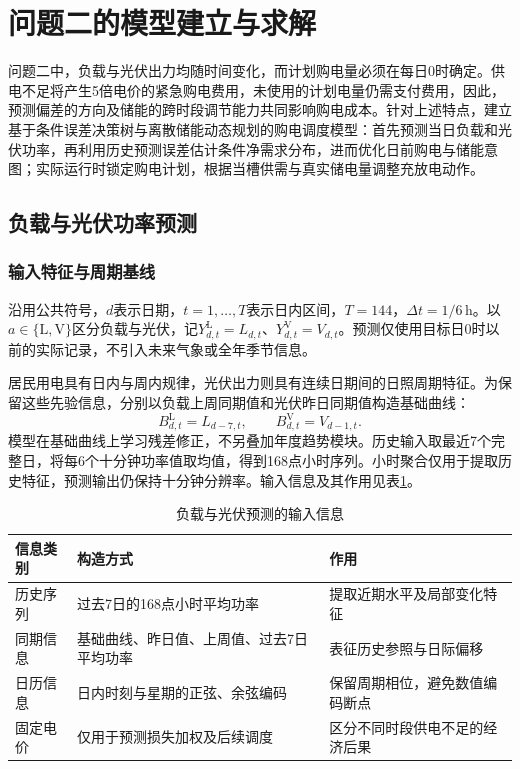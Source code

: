 \section{问题二的模型建立与求解}
\label{sec:q2-prediction}

问题二中，负载与光伏出力均随时间变化，而计划购电量必须在每日0时确定。供电不足将产生5倍电价的紧急购电费用，未使用的计划电量仍需支付费用，因此，预测偏差的方向及储能的跨时段调节能力共同影响购电成本。针对上述特点，建立基于条件误差决策树与离散储能动态规划的购电调度模型：首先预测当日负载和光伏功率，再利用历史预测误差估计条件净需求分布，进而优化日前购电与储能意图；实际运行时锁定购电计划，根据当槽供需与真实储电量调整充放电动作。

\subsection{负载与光伏功率预测}
\subsubsection{输入特征与周期基线}

沿用公共符号，$d$表示日期，$t=1,\ldots,T$表示日内区间，$T=144$，$\Delta t=1/6$\,h。以$a\in\{\mathrm L,\mathrm V\}$区分负载与光伏，记$Y^{\mathrm L}_{d,t}=L_{d,t}$、$Y^{\mathrm V}_{d,t}=V_{d,t}$。预测仅使用目标日0时以前的实际记录，不引入未来气象或全年季节信息。

居民用电具有日内与周内规律，光伏出力则具有连续日期间的日照周期特征。为保留这些先验信息，分别以负载上周同期值和光伏昨日同期值构造基础曲线：
\begin{equation}\label{eq:q2-base}
 B^{\mathrm L}_{d,t}=L_{d-7,t},\qquad B^{\mathrm V}_{d,t}=V_{d-1,t}.
\end{equation}
模型在基础曲线上学习残差修正，不另叠加年度趋势模块。历史输入取最近7个完整日，将每6个十分钟功率值取均值，得到168点小时序列。小时聚合仅用于提取历史特征，预测输出仍保持十分钟分辨率。输入信息及其作用见表\ref{tab:q2-input}。

\begin{table}[htbp]
\centering\small
\caption{负载与光伏预测的输入信息}\label{tab:q2-input}
\renewcommand{\arraystretch}{1.15}
\begin{tabularx}{\textwidth}{p{2.5cm}p{5.0cm}X}
\toprule
信息类别 & 构造方式 & 作用\\
\midrule
历史序列 & 过去7日的168点小时平均功率 & 提取近期水平及局部变化特征\\
同期信息 & 基础曲线、昨日值、上周值、过去7日平均功率 & 表征历史参照与日际偏移\\
日历信息 & 日内时刻与星期的正弦、余弦编码 & 保留周期相位，避免数值编码断点\\
固定电价 & 仅用于预测损失加权及后续调度 & 区分不同时段供电不足的经济后果\\
\bottomrule
\end{tabularx}
\end{table}

